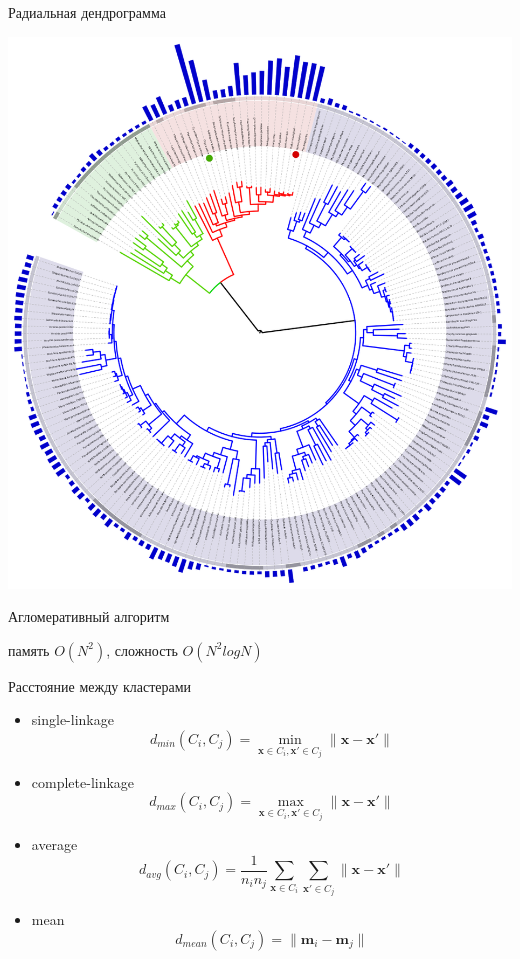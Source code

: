 \documentclass[10pt]{beamer}
\begin{document}
\begin{frame}{Радиальная дендрограмма}

\begin{center}
\includegraphics[scale=0.3]{images/radial.png}
\end{center}

\end{frame}

\begin{frame}{Агломеративный алгоритм}

\hier
память $O(N^2)$, сложность $O(N^2 log N)$

\end{frame}

\begin{frame}{Расстояние между кластерами}

\begin{itemize}
\item single-linkage
\[
d_{min}(C_i, C_j) = \min_{\mathbf{x} \in C_i, \mathbf{x}' \in C_j} \|\mathbf{x} -\mathbf{x}' \|
\]
\item complete-linkage
\[
d_{max}(C_i, C_j) = \max_{\mathbf{x} \in C_i, \mathbf{x}' \in C_j} \|\mathbf{x} -\mathbf{x}' \|
\]
\item average
\[
d_{avg}(C_i, C_j) = \frac{1}{n_i n_j}\sum_{\mathbf{x} \in C_i}\sum_{\mathbf{x}' \in C_j} \|\mathbf{x} -\mathbf{x}' \|
\]
\item mean
\[
d_{mean}(C_i, C_j) = \|\mathbf{m}_i -\mathbf{m}_j \|
\]
\end{itemize}

\end{frame}
\end{document}
